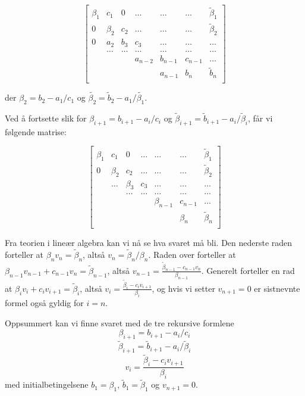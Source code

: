\documentclass[a4paper,10pt,english]{article}
\begin{document}
\[
    \begin{bmatrix}
        \beta_1& c_1 & 0 &\dots   & \dots &\dots &\tilde{\beta}_1 \\
        0 & \beta_2 & c_2 &\dots &\dots &\dots &\tilde{\beta}_2 \\
        0 & a_2 & b_3 & c_3 & \dots & \dots &\dots \\
        & \dots   & \dots &\dots   &\dots & \dots &\dots \\
        &   &  &a_{n-2}  &b_{n-1}& c_{n-1} &\dots \\
        &    &  &   &a_{n-1} & b_n &\tilde{b}_n \\
    \end{bmatrix}
\]

der $\beta_2 = b_2 - a_1/c_1$ og $\tilde{\beta_2} = \tilde{b}_2 - a_1/\tilde{\beta_1}$.

Ved å fortsette slik for $\beta_{i+1} = b_{i+1} - a_i/c_i$ og $\tilde{\beta}_{i+1} = \tilde{b}_{i+1} - a_i/\tilde{\beta}_i$, får vi følgende matrise:

\[
    \begin{bmatrix}
        \beta_1& c_1 & 0 &\dots   & \dots &\dots &\tilde{\beta}_1 \\
        0  & \beta_2 & c_2 &\dots &\dots &\dots &\tilde{\beta}_2 \\
           &\dots& \beta_3 & c_3 & \dots & \dots &\dots \\
        &   & \dots &\dots   &\dots & \dots &\dots \\
        &   &  &  &\beta_{n-1}& c_{n-1} &\dots \\
        &    &  &   & & \beta_n &\tilde{\beta}_n \\
    \end{bmatrix}
\]

Fra teorien i lineær algebra kan vi nå se hva svaret må bli. Den nederste raden forteller at $\beta_n v_n = \tilde{\beta}_n$, altså $v_n = \tilde{\beta}_n/\beta_n$. Raden over forteller at $\beta_{n-1} v_{n-1} + c_{n-1} v_n = \tilde{\beta}_{n-1}$, altså $v_{n-1} = \frac{\tilde{\beta}_{n-1} - c_{n-1} v_n}{\beta_{n-1}}$. Generelt forteller en rad at $\beta_i v_i + c_i v_{i+1} = \tilde{\beta}_i$, altså $v_i = \frac{\tilde{\beta}_i - c_i v_{i+1}}{\beta_i}$, og hvis vi setter $v_{n+1} = 0$ er sistnevnte formel også gyldig for $i = n$.

Oppsummert kan vi finne svaret med de tre rekursive formlene
$$\beta_{i+1} = b_{i+1} - a_i/c_i$$
$$\tilde{\beta}_{i+1} = \tilde{b}_{i+1} - a_i/\tilde{\beta}_i$$
$$v_i = \frac{\tilde{\beta}_i - c_i v_{i+1}}{\beta_i}$$
med initialbetingelsene $b_1 = \beta_1$, $\tilde{b}_1 = \tilde{\beta}_1$ og $v_{n+1} = 0$.
\end{document}
